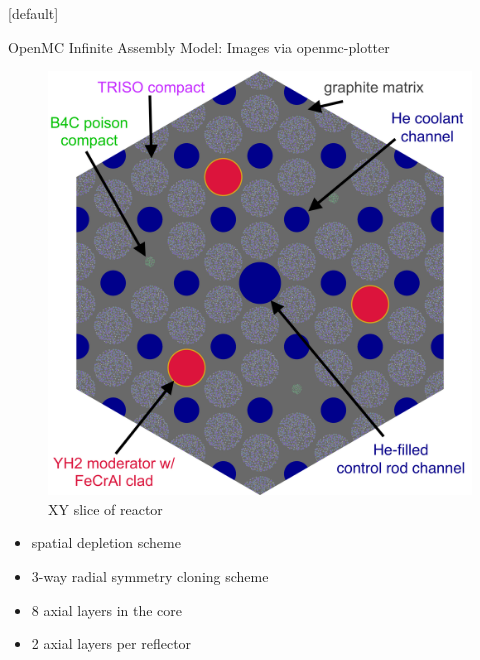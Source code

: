 \documentclass[9pt,t,aspectratio=169]{beamer}
\makeatletter
\newenvironment{withoutheadline}{
       \setbeamertemplate{headline}[default]
       \def\beamer@entrycode{\vspace*{-\headheight}}
    }{}
\makeatother
\begin{document}
\begin{withoutheadline}
\begin{frame}{OpenMC Infinite Assembly Model: Images via openmc-plotter \cite{openmc-plotter}}
\begin{minipage}[t]{0.45\linewidth}
\begin{figure}
            \includegraphics[height=0.8\textheight]{figures/gcmr_labeled_slice.png}
            \caption{XY slice of reactor}
        \end{figure}
    \end{minipage}
    \hfill%
    \begin{minipage}[t]{0.3\linewidth}
        \Large
        \begin{itemize}
            \item<4-> spatial depletion scheme
            \item<4-> 3-way radial symmetry cloning scheme
            \item<4-> 8 axial layers in the core
            \item<4-> 2 axial layers per reflector
        \end{itemize}
        \normalsize
    \end{minipage}
\end{frame}
\hypersetup{citecolor=black}
\end{withoutheadline}
\end{document}
